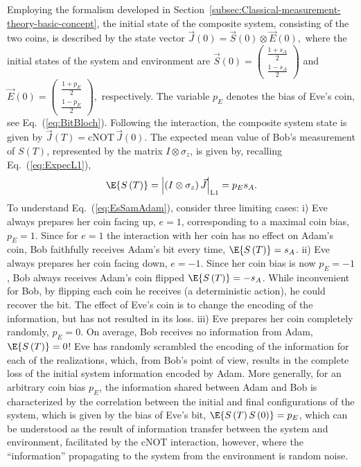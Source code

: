 Employing the formalism developed in Section~\ref{subsec:Classical-measurement-theory-basic-concept},
the initial state of the composite system, consisting of the two coins,
is described by the state vector $\vec{J}\left(0\right)=\vec{S}\left(0\right)\otimes\vec{E}\left(0\right),$
where the initial states of the system and environment are $\vec{S}\left(0\right)=\begin{pmatrix}\frac{1+s_{A}}{2}\\
\frac{1-s_{A}}{2}
\end{pmatrix}$ and $\vec{E}\left(0\right)=\begin{pmatrix}\frac{1+p_{E}}{2}\\
\frac{1-p_{E}}{2}
\end{pmatrix},$ respectively. The variable $p_{E}$ denotes the bias of Eve's coin,
see Eq.~(\ref{eq:BitBloch}). Following the interaction, the composite
system state is given by $\vec{J}\left(T\right)=\mathrm{cNOT\,}\vec{J}\left(0\right)$.
The expected mean value of Bob's measurement of $S\left(T\right)$,
represented by the matrix $I\otimes\sigma_{z}$, is given by, recalling
Eq.~(\ref{eq:ExpecL1}),
\begin{equation}
\E{S\left(T\right)}=\left|\left(I\otimes\sigma_{z}\right)\vec{J}\right|_{\mathrm{L1}}=p_{E}s_{A}.\label{eq:EsSamAdam}
\end{equation}
To understand Eq.~(\ref{eq:EsSamAdam}), consider three limiting
cases: i) Eve always prepares her coin facing up, $e=1$, corresponding
to a maximal coin bias, $p_{E}=1$. Since for $e=1$ the interaction
with her coin has no effect on Adam's coin, Bob faithfully receives
Adam's bit every time, $\E{S\left(T\right)}=s_{A}$. ii) Eve always
prepares her coin facing down, $e=-1$. Since her coin bias is now
$p_{E}=-1$, Bob always receives Adam's coin flipped $\E{S\left(T\right)}=-s_{A}$.
While inconvenient for Bob, by flipping each coin he receives (a deterministic
action), he could recover the bit. The effect of Eve's coin is to
change the encoding of the information, but has not resulted in its
loss. iii) Eve prepares her coin completely randomly, $p_{E}=0$.
On average, Bob receives no information from Adam, $\E{S\left(T\right)}=0$!
Eve has  randomly scrambled the encoding of the information for each
of the realizations, which, from Bob's point of view, results in the
complete loss of the initial system information encoded by Adam. More
generally, for an arbitrary coin bias $p_{E}$, the information shared
between Adam and Bob is characterized by the correlation between the
initial and final configurations of the system, which is given by
the bias of Eve's bit, $\E{S\left(T\right)S\left(0\right)}=p_{E}$,
which can be understood as the result of information transfer between
the system and environment, facilitated by the cNOT interaction, however,
where the ``information'' propagating to the system from the environment
is random noise. 

